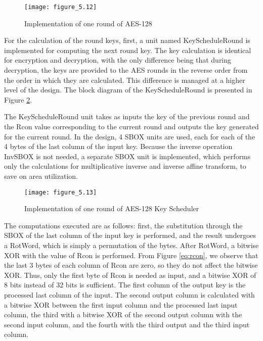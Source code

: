 \begin{figure}
\centering
\texttt{[image: figure\_5.12]}\\
\caption{  Implementation of one round of AES-128 }
\label{fig:figure_5.12}
\end{figure}

For the calculation of the round keys, first, a unit named KeyScheduleRound is implemented for computing the next round key. The key calculation is identical for encryption and decryption, with the only difference being that during decryption, the keys are provided to the AES rounds in the reverse order from the order in which they are calculated. This difference is managed at a higher level of the design. The block diagram of the KeyScheduleRound is presented in Figure \ref{fig:figure_5.13}.

The KeyScheduleRound unit takes as inputs the key of the previous round and the Rcon value corresponding to the current round and outputs the key generated for the current round. In the design, 4 SBOX units are used, each for each of the 4 bytes of the last column of the input key. Because the inverse operation InvSBOX is not needed, a separate SBOX unit is implemented, which performs only the calculations for multiplicative inverse and inverse affine transform, to save on area utilization.

\begin{figure}
\centering
\texttt{[image: figure\_5.13]}\\
\caption{ Implementation of one round of AES-128 Key Scheduler }
\label{fig:figure_5.13}
\end{figure}

The computations executed are as follows: first, the substitution through the SBOX of the last column of the input key is performed, and the result undergoes a RotWord, which is simply a permutation of the bytes. After RotWord, a bitwise XOR with the value of Rcon is performed. From Figure \ref{eq:rcon}, we observe that the last 3 bytes of each column of Rcon are zero, so they do not affect the bitwise XOR. Thus, only the first byte of Rcon is needed as input, and a bitwise XOR of 8 bits instead of 32 bits is sufficient. The first column of the output key is the processed last column of the input. The second output column is calculated with a bitwise XOR between the first input column and the processed last input column, the third with a bitwise XOR of the second output column with the second input column, and the fourth with the third output and the third input column.

